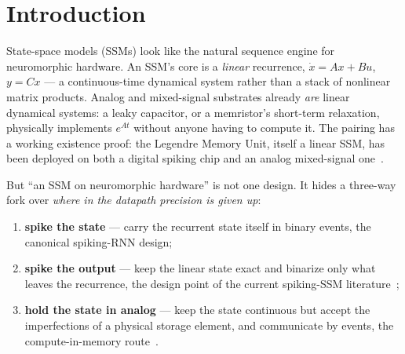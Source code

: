
\section{Introduction}
\label{sec:intro}

State-space models (SSMs) look like the natural sequence engine for neuromorphic hardware. An
SSM's core is a \emph{linear} recurrence, $\dot{x} = Ax + Bu$, $y = Cx$ --- a continuous-time
dynamical system rather than a stack of nonlinear matrix products. Analog and mixed-signal
substrates already \emph{are} linear dynamical systems: a leaky capacitor, or a memristor's
short-term relaxation, physically implements $e^{At}$ without anyone having to compute it. The
pairing has a working existence proof: the Legendre Memory Unit, itself a linear SSM, has been
deployed on both a digital spiking chip and an analog mixed-signal one~\citep{lmu}.

But ``an SSM on neuromorphic hardware'' is not one design. It hides a three-way fork over
\emph{where in the datapath precision is given up}:

\begin{enumerate}
  \item \textbf{spike the state} --- carry the recurrent state itself in binary events, the
    canonical spiking-RNN design;
  \item \textbf{spike the output} --- keep the linear state exact and binarize only what leaves
    the recurrence, the design point of the current spiking-SSM literature~\citep{spikessm};
  \item \textbf{hold the state in analog} --- keep the state continuous but accept the
    imperfections of a physical storage element, and communicate by events, the
    compute-in-memory route~\citep{cimssm}.
\end{enumerate}

